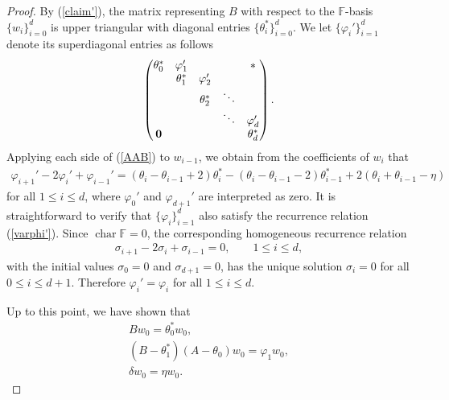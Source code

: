 \documentclass[pdftex]{sigma}
\def\F{\mathbb F}
\numberwithin{equation}{section}
\begin{document}
\begin{proof}
By (\ref{claim'}), the matrix representing $B$ with respect to the $\F$-basis $\{w_i\}_{i=0}^d$ is upper triangular with diagonal entries $\{\theta_i^*\}_{i=0}^d$. We let $\{\varphi_i'\}_{i=1}^d$ denote its superdiagonal entries as follows
\begin{gather}\label{B}
\begin{pmatrix}
\theta_0^* &\varphi_1' & & &{\bf *}
\\
 &\theta_1^* &\varphi_2'
\\
 & &\theta_2^* &\ddots
 \\
 & & &\ddots &\varphi_d'
 \\
{\bf 0} & & & &\theta_d^*
\end{pmatrix}.
\end{gather}
Applying each side of (\ref{AAB}) to $w_{i-1}$, we obtain from the coefficients of $w_i$ that
\begin{gather}\label{varphi'}
\varphi_{i+1}'-2\varphi_i'+\varphi_{i-1}'
=(\theta_i-\theta_{i-1}+2)\theta_i^*
-(\theta_i-\theta_{i-1}-2)\theta_{i-1}^*
+2(\theta_i+\theta_{i-1}-\eta)
\end{gather}
for all $1\leq i\leq d$, where $\varphi_0'$ and $\varphi_{d+1}'$ are interpreted as zero.
It is straightforward to verify that $\{\varphi_i\}_{i=1}^d$ also satisfy the recurrence relation (\ref{varphi'}). Since $\operatorname{char}\F=0$, the corresponding homogeneous recurrence relation
\begin{gather*}
\sigma_{i+1}-2\sigma_i+\sigma_{i-1}=0, \qquad 1\leq i\leq d,
\end{gather*}
with the initial values $\sigma_0=0$ and $\sigma_{d+1}=0$, has the unique solution $\sigma_i=0$ for all $0\leq i\leq d+1$. Therefore $\varphi_i'=\varphi_i$ for all $1\leq i\leq d$.

Up to this point, we have shown that
\begin{gather}
Bw_0=\theta_0^* w_0,\label{even:U1}\\
(B-\theta_1^*)(A-\theta_0)w_0=\varphi_1 w_0,\label{even:U2}\\
\delta w_0=\eta w_0.\label{even:U3}
\end{gather}


\end{proof}
\end{document}
